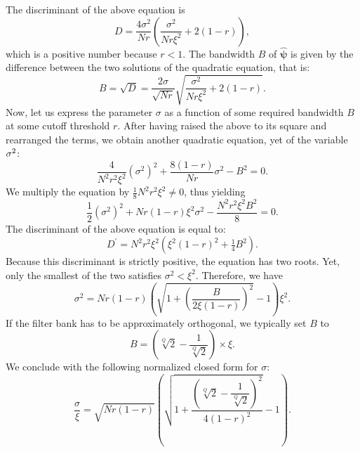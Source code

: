 \documentclass[smallextended]{svjour3}
\begin{document}
The discriminant of the above equation is
\[
D=\dfrac{4\sigma^2}{Nr}
\left(
\dfrac{\sigma^2}{Nr\xi^2}
+
2(1-r)
\right),
\]
which is a positive number because $r<1$.
The bandwidth $B$ of $\boldsymbol{\hat{\psi}}$ is given by the difference between the two solutions of the quadratic equation, that is:
\[
B = 
\sqrt{D} =
\dfrac{2\sigma}{\sqrt{N r}}
\sqrt{\dfrac{\sigma^2}{N r \xi^2} + 2 (1-r)}
.
\]
Now, let us express the parameter $\sigma$ as a function of some
required bandwidth $B$ at some cutoff threshold $r$. After having
raised the above to its square and rearranged the terms, we obtain
another quadratic equation, yet of the variable $\mbox{\ensuremath{\sigma}}^{2}$:
\[
\dfrac{4}{N^2 r^2 \xi^2} (\sigma^2)^2 + \dfrac{8 (1-r)}{N r} \sigma^2 - B^2 = 0.
\]
We multiply the equation by $\tfrac{1}{8} N^2 r^2 \xi^2 \neq 0$, thus yielding
\[
\dfrac{1}{2} (\sigma^2)^2
+
N r (1-r) \xi^2 \sigma^2
-
\dfrac{N^2 r^2 \xi^2 B^2}{8}
= 0.
\]
The discriminant of the above equation is equal to:
\[
D^\prime = N^2 r^2 \xi^2 \left(\xi^2 (1-r)^2 + \tfrac{1}{4}B^2\right).
\]
Because this discriminant is strictly positive, the equation has two roots.
Yet, only the smallest of the two satisfies $\sigma^2 < \xi^2$.
Therefore, we have
\[
\sigma^{2}=
N r (1-r)
\left(
\sqrt{1 + \left(\dfrac{B}{2\xi (1-r)}\right)^2}
- 1\right) \xi^2 
.
\]
If the filter bank has to be approximately orthogonal, we typically
set $B$ to
\[
B = 
\left(\sqrt[Q]{2} - \dfrac{1}{\sqrt[Q]{2}} \right)
\times \xi.
\]
We conclude with the following normalized closed form for $\sigma$:
\[
\dfrac{\sigma}{\xi} = \sqrt{N r (1-r)}
\left(
\sqrt{
1 +
\dfrac{\left(\sqrt[Q]{2} - \dfrac{1}{\sqrt[Q]{2}} \right)^2}{
4 (1-r)^2
}}
- 1\right).
\]
\end{document}
